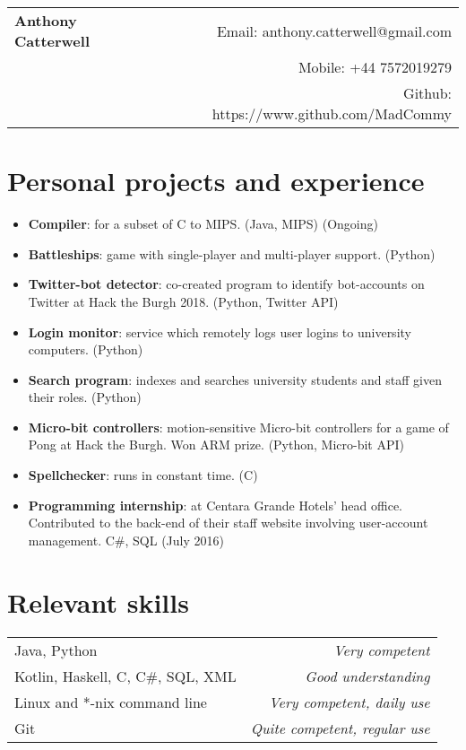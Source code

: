 \documentclass[11pt,a4paper]{article}
\begin{document}
\noindent

\begin{tabularx}{\textwidth}{X r}
    \huge{\textbf{Anthony Catterwell}} 
    & Email: anthony.catterwell@gmail.com \\
    & Mobile: +44 7572019279 \\
    & Github: https://www.github.com/MadCommy \\
\end{tabularx}

\hline
\section*{Personal projects and experience}
\begin{itemize}
    \item \textbf{Compiler}:
        for a subset of C to MIPS.
        (Java, MIPS) (Ongoing)
    \item \textbf{Battleships}: game with single-player
        and multi-player support.  
        (Python)
    \item \textbf{Twitter-bot detector}:
        co-created program to identify 
        bot-accounts on Twitter at Hack the Burgh 2018.
        (Python, Twitter API)
    \item \textbf{Login monitor}:
        service which remotely logs user
        logins to university computers. (Python)
    \item \textbf{Search program}:
        indexes and searches university students and 
        staff given their roles.  (Python)
    \item \textbf{Micro-bit controllers}:
        motion-sensitive Micro-bit controllers for a 
        game of Pong at Hack the Burgh. Won ARM prize.
        (Python, Micro-bit API)
    \item \textbf{Spellchecker}:
        runs in constant time. (C)
    \item \textbf{Programming internship}:
        at Centara Grande Hotels' head office.
        Contributed to the back-end of their staff website involving user-account management.
        C#, SQL (July 2016)
\end{itemize}

\hline
\section*{Relevant skills}
\begin{tabularx}{\textwidth}{X r}
    Java, Python & \textit{Very competent} \\
    Kotlin, Haskell, C, C#, SQL, XML & \textit{Good understanding} \\
    Linux and *-nix command line & \textit{Very competent, daily use} \\
    Git & \textit{Quite competent, regular use} \\
\end{tabularx}
\end{document}
